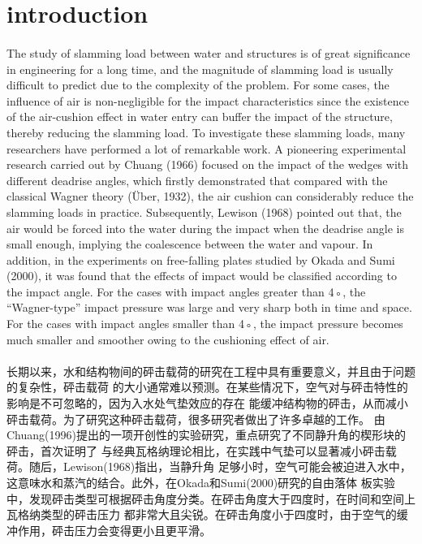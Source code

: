 \documentclass[UTF8]{ctexart}
\begin{document}
\section{introduction}
\paragraph{\quad}The study of slamming load between water and structures is 
                of great significance in engineering for a long time, and the 
                magnitude of slamming load is usually difficult to predict due 
                to the complexity of the problem. For some cases, the influence 
                of air is non-negligible for the impact characteristics since the 
                existence of the air-cushion effect in water entry can buffer the 
                impact of the structure, thereby reducing the slamming load. To 
                investigate these slamming loads, many researchers have performed 
                a lot of remarkable work. A pioneering experimental research carried 
                out by Chuang (1966) focused on the impact of the wedges with 
                different deadrise angles, which firstly demonstrated that compared 
                with the classical Wagner theory (Über, 1932), the air cushion can 
                considerably reduce the slamming loads in practice. Subsequently, Lewison (1968) 
                pointed out that, the air would be forced into the water during the 
                impact when the deadrise angle is small enough, implying the coalescence 
                between the water and vapour. In addition, in the experiments on 
                free-falling plates studied by Okada and Sumi (2000), it was found that 
                the effects of impact would be classified according to the impact angle. 
                For the cases with impact angles greater than 4◦, the “Wagner-type” impact 
                pressure was large and very sharp both in time and space. For the cases with 
                impact angles smaller than 4◦, the impact pressure becomes much smaller and 
                smoother owing to the cushioning effect of air.
\paragraph{\quad}长期以来，水和结构物间的砰击载荷的研究在工程中具有重要意义，并且由于问题的复杂性，砰击载荷
                的大小通常难以预测。在某些情况下，空气对与砰击特性的影响是不可忽略的，因为入水处气垫效应的存在
                能缓冲结构物的砰击，从而减小砰击载荷。为了研究这种砰击载荷，很多研究者做出了许多卓越的工作。
                由Chuang(1996)提出的一项开创性的实验研究，重点研究了不同静升角的楔形块的砰击，首次证明了
                与经典瓦格纳理论相比，在实践中气垫可以显著减小砰击载荷。随后，Lewison(1968)指出，当静升角
                足够小时，空气可能会被迫进入水中，这意味水和蒸汽的结合。此外，在Okada和Sumi(2000)研究的自由落体
                板实验中，发现砰击类型可根据砰击角度分类。在砰击角度大于四度时，在时间和空间上瓦格纳类型的砰击压力
                都非常大且尖锐。在砰击角度小于四度时，由于空气的缓冲作用，砰击压力会变得更小且更平滑。
\end{document}
